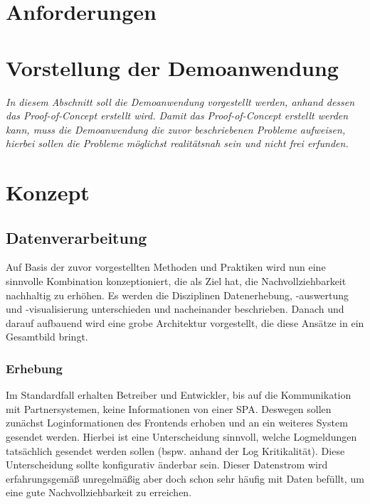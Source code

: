 	
\section{Anforderungen}

	
\section{Vorstellung der Demoanwendung}

	\textit{In diesem Abschnitt soll die Demoanwendung vorgestellt werden, anhand dessen das Proof-of-Concept erstellt wird. Damit das Proof-of-Concept erstellt werden kann, muss die Demoanwendung die zuvor beschriebenen Probleme aufweisen, hierbei sollen die Probleme möglichst realitätsnah sein und nicht frei erfunden.}
	
\newpage
	
\section{Konzept}
	
	\subsection{Datenverarbeitung}

	Auf Basis der zuvor vorgestellten Methoden und Praktiken wird nun eine sinnvolle Kombination konzeptioniert, die als Ziel hat, die Nachvollziehbarkeit nachhaltig zu erhöhen. Es werden die Disziplinen Datenerhebung, -auswertung und -visualisierung unterschieden und nacheinander beschrieben. Danach und darauf aufbauend wird eine grobe Architektur vorgestellt, die diese Ansätze in ein Gesamtbild bringt.
		
	\subsubsection{Erhebung}
		
	Im Standardfall erhalten Betreiber und Entwickler, bis auf die Kommunikation mit Partnersystemen, keine Informationen von einer SPA. Deswegen sollen zunächst Loginformationen des Frontends erhoben und an ein weiteres System gesendet werden. Hierbei ist eine Unterscheidung sinnvoll, welche Logmeldungen tatsächlich gesendet werden sollen (bspw. anhand der Log Kritikalität). Diese Unterscheidung sollte konfigurativ änderbar sein. Dieser Datenstrom wird erfahrungsgemäß unregelmäßig aber doch schon sehr häufig mit Daten befüllt, um eine gute Nachvollziehbarkeit zu erreichen.
		
